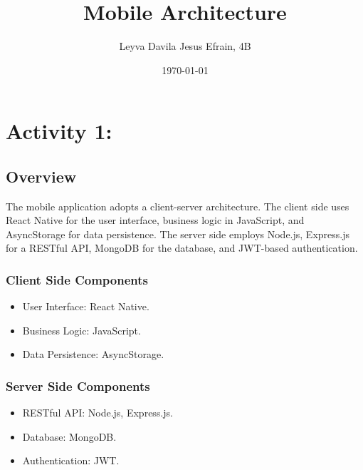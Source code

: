 \documentclass{article}
\title{Mobile Architecture}
\author{Leyva Davila Jesus Efrain, 4B}
\date{\today}
\begin{document}
\maketitle

\section{Activity 1:}

\subsection{Overview}
The mobile application adopts a client-server architecture. The client side uses React Native for the user interface, business logic in JavaScript, and AsyncStorage for data persistence. The server side employs Node.js, Express.js for a RESTful API, MongoDB for the database, and JWT-based authentication.

\subsubsection{Client Side Components}
\begin{itemize}
    \item User Interface: React Native.
    \item Business Logic: JavaScript.
    \item Data Persistence: AsyncStorage.
\end{itemize}

\subsubsection{Server Side Components}
\begin{itemize}
    \item RESTful API: Node.js, Express.js.
    \item Database: MongoDB.
    \item Authentication: JWT.
\end{itemize}
\end{document}

